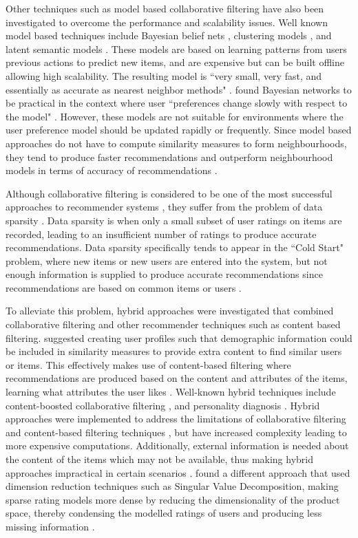 Other techniques such as model based collaborative filtering have also been investigated to overcome the performance and scalability issues. Well known model based techniques include Bayesian belief nets \cite{baysian}, clustering models \cite{clustering}, and latent semantic models \cite{latent}. These models are based on learning patterns from users previous actions to predict new items, and are expensive but can be built offline allowing high scalability. The resulting model is ``very small, very fast, and essentially as accurate as nearest neighbor methods" \cite{itembased}. \citeauthor{itembased} found Bayesian networks to be practical in the context where user ``preferences change slowly with respect to the model" \cite{itembased}. However, these models are not suitable for environments where the user preference model should be updated rapidly or frequently. Since model based approaches do not have to compute similarity measures to form neighbourhoods, they tend to produce faster recommendations and outperform neighbourhood models in terms of accuracy of recommendations \cite{toward, itembased}. 

Although collaborative filtering is considered to be one of the most successful approaches to recommender systems \cite{survey, toward}, they suffer from the problem of data sparsity \cite{toward, survey, itembased, koren2009matrix, koren2011, dimension}. Data sparsity is when only a small subset of user ratings on items are recorded, leading to an insufficient number of ratings to produce accurate recommendations. Data sparsity specifically tends to appear in the ``Cold Start" problem, where new items or new users are entered into the system, but not enough information is supplied to produce accurate recommendations since recommendations are based on common items or users \cite{survey}.

To alleviate this problem, hybrid approaches were investigated that combined collaborative filtering and other recommender techniques such as content based filtering. \citeauthor{toward} suggested creating user profiles such that demographic information could be included in similarity measures to provide extra content to find similar users or items. This effectively makes use of content-based filtering where recommendations are produced based on the content and attributes of the items, learning what attributes the user likes \cite{toward}. Well-known hybrid techniques include content-boosted collaborative filtering \cite{hybrid}, and personality diagnosis \cite{hybrid2, survey}. Hybrid approaches were implemented to address the limitations of collaborative filtering and content-based filtering techniques \cite{toward}, but have increased complexity leading to more expensive computations. Additionally, external information is needed about the content of the items which may not be available, thus making hybrid approaches impractical in certain scenarios \cite{survey}. \citeauthor{dimension} found a different approach that used dimension reduction techniques such as Singular Value Decomposition, making sparse rating models more dense by reducing the dimensionality of the product space, thereby condensing the modelled ratings of users and producing less missing information \cite{dimension}. 

